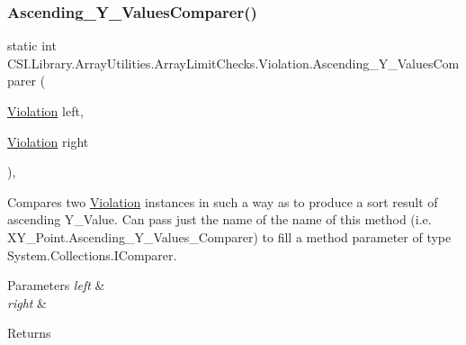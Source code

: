 \subsubsection{\texorpdfstring{Ascending\_Y\_ValuesComparer()}{Ascending\_Y\_ValuesComparer()}}
{\footnotesize\ttfamily static int C\+S\+I.\+Library.\+Array\+Utilities.\+Array\+Limit\+Checks.\+Violation.\+Ascending\+\_\+\+Y\+\_\+\+Values\+Comparer (\begin{DoxyParamCaption}\item[{\mbox{\hyperlink{class_c_s_i_1_1_library_1_1_array_utilities_1_1_array_limit_checks_1_1_violation}{Violation}}}]{left,  }\item[{\mbox{\hyperlink{class_c_s_i_1_1_library_1_1_array_utilities_1_1_array_limit_checks_1_1_violation}{Violation}}}]{right }\end{DoxyParamCaption})\hspace{0.3cm}{\ttfamily [inline]}, {\ttfamily [static]}}



Compares two \mbox{\hyperlink{class_c_s_i_1_1_library_1_1_array_utilities_1_1_array_limit_checks_1_1_violation}{Violation}} instances in such a way as to produce a sort result of ascending Y\+\_\+\+Value. Can pass just the name of the name of this method (i.\+e. X\+Y\+\_\+\+Point.\+Ascending\+\_\+\+Y\+\_\+\+Values\+\_\+\+Comparer) to fill a method parameter of type System.\+Collections.\+I\+Comparer. 


\begin{DoxyParams}{Parameters}
{\em left} & \\
\hline
{\em right} & \\
\hline
\end{DoxyParams}
\begin{DoxyReturn}{Returns}

\end{DoxyReturn}
\mbox{\label{class_c_s_i_1_1_library_1_1_array_utilities_1_1_array_limit_checks_1_1_violation_a647e6fc658bf99fef6b59014364876a0}} 
